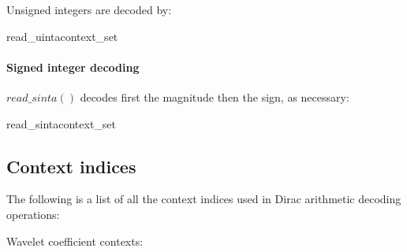 Unsigned integers are decoded by:

\begin{pseudo}{read\_uinta}{context\_set}
  \bsEND
\bsEND
{}
\end{pseudo}

\paragraph{Signed integer decoding \\}

$read\_sinta()$ decodes first the magnitude then the sign, as necessary:

\begin{pseudo}{read\_sinta}{context\_set}
  \bsEND
\bsEND
{}
\end{pseudo}

\subsection{Context indices}
\label{contextindices}

The following is a list of all the context indices used in Dirac arithmetic decoding operations:

Wavelet coefficient contexts:

\SignZero\\
\SignPos\\
\SignNeg\\
\ZPZNFollowOne\\
\ZPNNFollowOne\\
\ZPFollowTwo\\
\ZPFollowThree\\
\ZPFollowFour\\
\ZPFollowFive\\
\ZPFollowSixPlus\\
\NPZNFollowOne\\
\NPNNFollowOne\\
\NPFollowTwo\\
\NPFollowThree\\
\NPFollowFour\\
\NPFollowFive\\
\NPFollowSixPlus\\
\CoeffData\\
\ZeroCodeblock\\
\QOffsetFollow\\
\QOffsetInfo\\
\QOffsetSign\\

